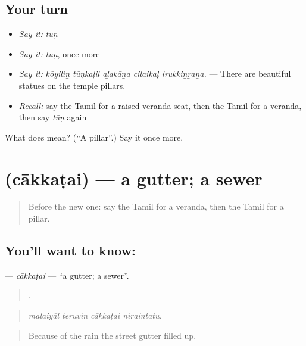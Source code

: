 \subsection*{Your turn}
\begin{itemize}
\raggedright
  \item \emph{Say it:} \emph{tūṇ}
  \item \emph{Say it:} \emph{tūṇ}, once more
  \item \emph{Say it:} \emph{kōyiliṉ tūṇkaḷil aḻakāṉa cilaikaḷ irukkiṉṟaṉa.} — There are beautiful statues on the temple pillars.
  \item \emph{Recall:} say the Tamil for a raised veranda seat, then the Tamil for a veranda, then say \emph{tūṇ} again
\end{itemize}

\begin{tcolorbox}[breakable,colback=teal!4,colframe=teal!35!black,title={Before you move on}]
What does  mean? (\textquotedblleft{}A pillar\textquotedblright{}.) Say it once more.
\end{tcolorbox}
\section[\texorpdfstring{\ta{சாக்கடை} (cākkaṭai)}{சாக்கடை (cākkaṭai)}]{ (cākkaṭai) — a gutter; a sewer}

\label{lesson:TA-C522-cakkatai}



\begin{quote}
Before the new one: say the Tamil for a veranda, then the Tamil for a pillar.
\end{quote}

\subsection*{You'll want to know: }
\textbf{} — \emph{cākkaṭai} — \textquotedblleft{}a gutter; a sewer\textquotedblright{}.

\begin{quote}
   .
\end{quote}

\begin{quote}
\emph{maḻaiyāl teruviṉ cākkaṭai niṟaintatu.}
\end{quote}

\begin{quote}
Because of the rain the street gutter filled up.
\end{quote}

